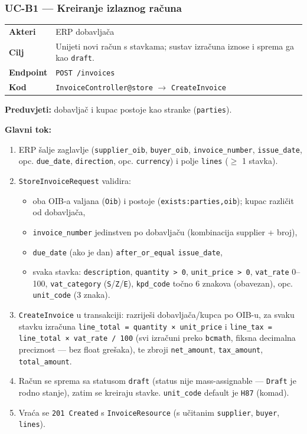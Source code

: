 \documentclass[11pt,a4paper]{article}
\begin{document}
\subsubsection{UC-B1 — Kreiranje izlaznog računa}

\begin{tabularx}{\textwidth}{@{}lY@{}}
\toprule
\textbf{Akteri} & ERP dobavljača \\
\textbf{Cilj} & Unijeti novi račun s stavkama; sustav izračuna iznose i sprema ga kao \texttt{draft}. \\
\textbf{Endpoint} & \texttt{POST /invoices} \\
\textbf{Kod} & \texttt{InvoiceController@store} $\rightarrow$ \texttt{CreateInvoice} \\
\bottomrule
\end{tabularx}

\textbf{Preduvjeti:} dobavljač i kupac postoje kao stranke (\texttt{parties}).

\textbf{Glavni tok:}
\begin{enumerate}[nosep]
  \item ERP šalje zaglavlje (\texttt{supplier\_oib}, \texttt{buyer\_oib}, \texttt{invoice\_number}, \texttt{issue\_date},
        opc. \texttt{due\_date}, \texttt{direction}, opc. \texttt{currency}) i polje \texttt{lines} ($\geq$ 1 stavka).
  \item \texttt{StoreInvoiceRequest} validira:
    \begin{itemize}[nosep]
      \item oba OIB-a valjana (\texttt{Oib}) i postoje (\texttt{exists:parties,oib}); kupac različit od dobavljača,
      \item \texttt{invoice\_number} jedinstven po dobavljaču (kombinacija supplier + broj),
      \item \texttt{due\_date} (ako je dan) \texttt{after\_or\_equal} \texttt{issue\_date},
      \item svaka stavka: \texttt{description}, \texttt{quantity > 0}, \texttt{unit\_price > 0}, \texttt{vat\_rate} 0--100,
            \texttt{vat\_category} (\texttt{S}/\texttt{Z}/\texttt{E}), \texttt{kpd\_code} točno 6 znakova (obavezan), opc. \texttt{unit\_code} (3 znaka).
    \end{itemize}
  \item \texttt{CreateInvoice} u transakciji: razriješi dobavljača/kupca po OIB-u, za svaku stavku
        izračuna \texttt{line\_total = quantity × unit\_price} i \texttt{line\_tax = line\_total × vat\_rate / 100}
        (svi izračuni preko \texttt{bcmath}, fiksna decimalna preciznost — bez float grešaka),
        te zbroji \texttt{net\_amount}, \texttt{tax\_amount}, \texttt{total\_amount}.
  \item Račun se sprema sa statusom \texttt{draft} (status nije mass-assignable — \texttt{Draft} je rodno
        stanje), zatim se kreiraju stavke. \texttt{unit\_code} default je \texttt{H87} (komad).
  \item Vraća se \texttt{201 Created} s \texttt{InvoiceResource} (s učitanim \texttt{supplier}, \texttt{buyer}, \texttt{lines}).
\end{enumerate}
\end{document}
